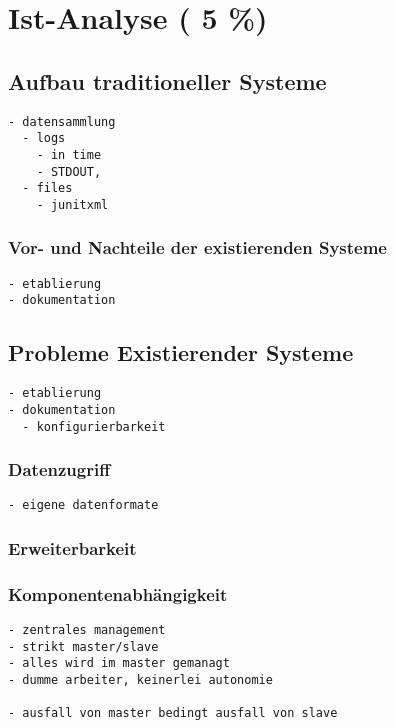 \chapter{Ist-Analyse ( 5 \%)}
\label{chap:ist-analyse}


\section{Aufbau traditioneller Systeme}

\begin{verbatim}
- datensammlung
  - logs
    - in time
    - STDOUT,
  - files
    - junitxml
\end{verbatim}

\subsection{Vor- und Nachteile der existierenden Systeme}

\begin{verbatim}
- etablierung
- dokumentation
\end{verbatim}



\section{Probleme Existierender Systeme}

\begin{verbatim}
- etablierung
- dokumentation
  - konfigurierbarkeit
\end{verbatim}

\subsection{Datenzugriff}
\begin{verbatim}
- eigene datenformate
\end{verbatim}
\subsection{Erweiterbarkeit}

\subsection{Komponentenabh\"angigkeit}
\begin{verbatim}
- zentrales management
- strikt master/slave
- alles wird im master gemanagt
- dumme arbeiter, keinerlei autonomie

- ausfall von master bedingt ausfall von slave


\end{verbatim}

